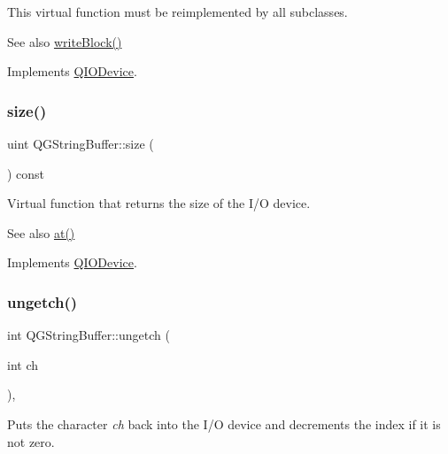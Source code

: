 This virtual function must be reimplemented by all subclasses.

\begin{DoxySeeAlso}{See also}
\mbox{\hyperlink{class_q_g_string_buffer_aab6c9a7bfbc048b4adff01f4bf920efa}{write\+Block()}} 
\end{DoxySeeAlso}


Implements \mbox{\hyperlink{class_q_i_o_device_a71f10647e4bd98141f45362b9a06983a}{Q\+I\+O\+Device}}.

\mbox{\label{class_q_g_string_buffer_ad7206e39b7cc87a42717ded03d700cd8}} 
\subsubsection{\texorpdfstring{size()}{size()}}
{\footnotesize\ttfamily uint Q\+G\+String\+Buffer\+::size (\begin{DoxyParamCaption}{ }\end{DoxyParamCaption}) const\hspace{0.3cm}{\ttfamily [virtual]}}

Virtual function that returns the size of the I/O device. \begin{DoxySeeAlso}{See also}
\mbox{\hyperlink{class_q_g_string_buffer_a8aa888c83b2a77c20fb60fa7d07a143b}{at()}} 
\end{DoxySeeAlso}


Implements \mbox{\hyperlink{class_q_i_o_device_a60c4146763625213ac7aa29f1f071592}{Q\+I\+O\+Device}}.

\mbox{\label{class_q_g_string_buffer_a6e97e3b078054bdeb5ee62d6970e7863}} 
\subsubsection{\texorpdfstring{ungetch()}{ungetch()}}
{\footnotesize\ttfamily int Q\+G\+String\+Buffer\+::ungetch (\begin{DoxyParamCaption}\item[{int}]{ch }\end{DoxyParamCaption})\hspace{0.3cm}{\ttfamily [inline]}, {\ttfamily [virtual]}}

Puts the character {\itshape ch} back into the I/O device and decrements the index if it is not zero.

